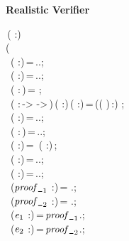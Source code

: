 \textbf{Realistic Verifier}
\begin{holmath}
    \,( :)\,\HOLSymConst{\HOLTokenEquiv{}}\\
(\\
\,\,\,( :)\,=\,..;\\
\,\,\,( :)\,=\,..;\\
\,\,\,( :\,)\,=\,\,;\\
\,\,\,( :\,->\,\,->\,)\,( :)\,( :)\,=\,((\,\HOLSymConst{\HOLTokenProd{}}\,)\,:)\,\,;\\
\,\,\,( :)\,=\,..;\\
\,\,\,( :\,)\,=\,..;\\
\,\,\,( :)\,=\,\,\,( :)\,;\\
\,\,\,(\HOLBoundVar{\ensuremath{\alpha}} :)\,=\,..;\\
\,\,\,(\HOLBoundVar{\ensuremath{\beta}} :)\,=\,..;\\
\,\,\,(\ensuremath{\HOLBoundVar{proof\HOLTokenUnderscore{}}\sb{\mathrm{1}}} :)\,=\,\,.;\\
\,\,\,(\ensuremath{\HOLBoundVar{proof\HOLTokenUnderscore{}}\sb{\mathrm{2}}} :)\,=\,\,.;\\
\,\,\,(\ensuremath{\HOLBoundVar{e}\sb{\mathrm{1}}} :)\,=\,\ensuremath{\HOLBoundVar{proof\HOLTokenUnderscore{}}\sb{\mathrm{1}}}.;\\
\,\,\,(\ensuremath{\HOLBoundVar{e}\sb{\mathrm{2}}} :)\,=\,\ensuremath{\HOLBoundVar{proof\HOLTokenUnderscore{}}\sb{\mathrm{2}}}.;\\

\end{holmath}
